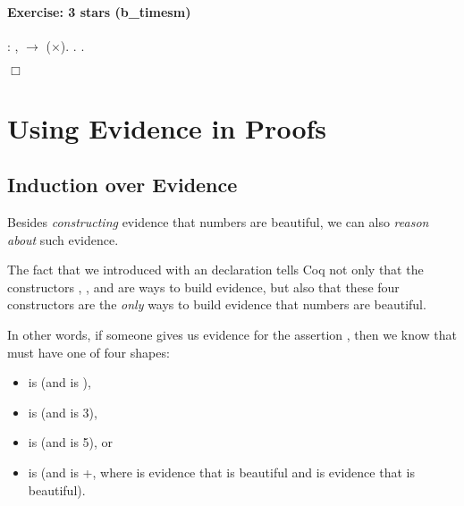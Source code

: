 \documentclass[12pt]{report}
\begin{document}
\paragraph{Exercise: 3 stars (b\_timesm)}

\begin{coqdoccode}
\coqdocnoindent
{} : \coqdockw{\ensuremath{\forall}}  ,   \ensuremath{\rightarrow}  (\ensuremath{\times}).\coqdoceol
\coqdocnoindent
{}.\coqdoceol
 .\coqdoceol
\end{coqdoccode}
\ensuremath{\Box} \begin{coqdoccode}
\coqdocemptyline
\end{coqdoccode}
\section{Using Evidence in Proofs}

\subsection{Induction over Evidence}



 Besides \textit{constructing} evidence that numbers are beautiful, we can
    also \textit{reason about} such evidence. 

 The fact that we introduced  with an 
    declaration tells Coq not only that the constructors , ,
     and  are ways to build evidence, but also that these
    four constructors are the \textit{only} ways to build evidence that
    numbers are beautiful. 

 In other words, if someone gives us evidence  for the assertion
     , then we know that  must have one of four shapes:



\begin{itemize}
\item  {} is  (and  is ),

\item  {} is  (and  is 3), 

\item  {} is  (and  is 5), or 

\item  {} is      (and  is +, where  is
        evidence that  is beautiful and  is evidence that 
        is beautiful). 
\end{itemize}
\end{document}
